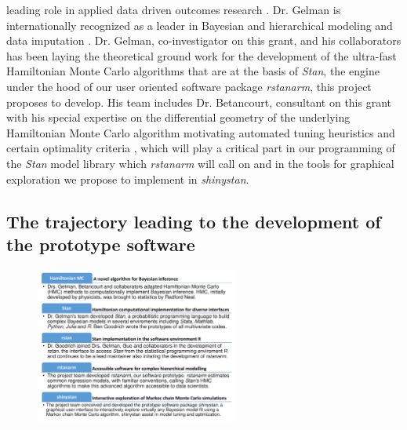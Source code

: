 \documentclass[11pt,notitlepage]{article}
\begin{document}
leading role in applied data driven outcomes research 
\cite{Gong2005, Gong2010, Gajic2011, Yu_24970344, Kor2014}. 
Dr. Gelman is internationally recognized as a leader in Bayesian and hierarchical 
modeling and data imputation 
\cite{Gelman1998notasked, Gelman2001imputation, Hoffman2014, Gelman-Hill_2014}. 
Dr. Gelman, co-investigator on this grant, and his collaborators has been laying the 
theoretical ground work for the development of the ultra-fast Hamiltonian 
Monte Carlo algorithms \cite{Hoffman2014,Stan_Software_2014} 
that are at the basis of \textit{Stan}, the engine 
under the hood of our user oriented software package \textit{rstanarm}, 
this project proposes to develop. His team includes Dr. Betancourt, 
consultant on this grant with his special expertise on the differential 
geometry of the underlying Hamiltonian Monte Carlo algorithm
motivating automated tuning heuristics and certain optimality criteria 
\cite{BetancourtGeometry2016}, which will play a 
critical part in our programming of the \textit{Stan} model library 
which \textit{rstanarm} will call on and in the tools for graphical exploration
we propose to implement in \textit{shinystan}.

\subsection*{The trajectory leading to the development of the prototype software} 

\begin{figure} %
    \centering
\includegraphics[width=0.6\textwidth]{Figures/SoftwareTrajectory.pdf}
\end{figure}
\end{document}
